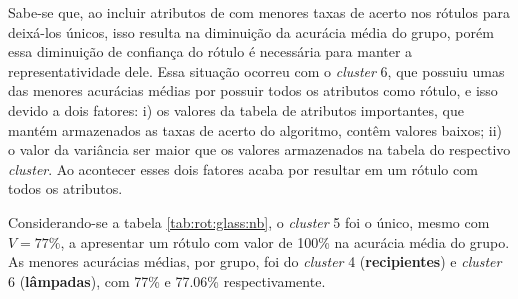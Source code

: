Sabe-se que, ao incluir atributos de com menores taxas de acerto nos rótulos para deixá-los únicos, isso resulta na diminuição da acurácia média do grupo, porém essa diminuição de confiança do rótulo é necessária para manter a representatividade dele. Essa situação ocorreu com o \textit{cluster} 6, que possuiu umas das menores acurácias médias por possuir todos os atributos como rótulo, e isso devido a dois fatores: i) os valores da tabela de atributos importantes, que mantém armazenados as taxas de acerto do algoritmo, contêm valores baixos; ii) o valor da variância ser maior que os valores armazenados na tabela do respectivo \textit{cluster}. Ao acontecer esses dois fatores acaba por  resultar em um rótulo com todos os atributos. 

Considerando-se a tabela \ref{tab:rot:glass:nb}, o \textit{cluster} 5 foi o único, mesmo com ${V=77\%}$, a apresentar um rótulo com valor de 100\% na acurácia média do grupo. As menores acurácias médias, por grupo, foi do \textit{cluster} 4 (\textbf{recipientes}) e \textit{cluster} 6 (\textbf{lâmpadas}), com 77\% e 77.06\% respectivamente. 


